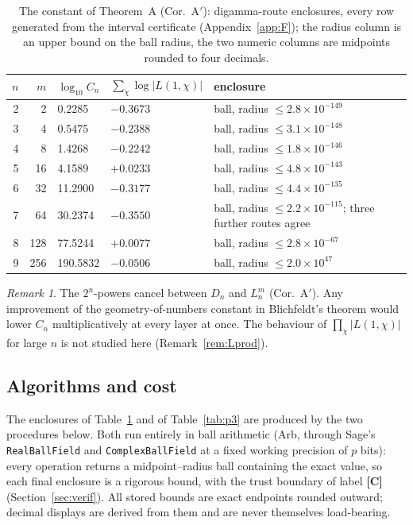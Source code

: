 \documentclass[11pt]{amsart}
\theoremstyle{remark}\newtheorem{remark}[theorem]{Remark}
\theoremstyle{definition}\newtheorem{definition}[theorem]{Definition}
\theoremstyle{definition}\newtheorem{algorithm}[theorem]{Algorithm}
\newcommand{\lbl}[1]{\textbf{[#1]}}\newcommand{\barT}{\bar T_n}
\begin{document}
\begin{table}[h]\footnotesize
\begin{tabular}{@{}rrllp{5.6cm}@{}}\toprule
$n$ & $m$ & $\log_{10}C_n$ & $\sum_\chi\log|L(1,\chi)|$ & enclosure\\ \midrule
2 & 2 & 0.2285 & $-0.3673$ & ball, radius $\le2.8\times10^{-149}$\\
3 & 4 & 0.5475 & $-0.2388$ & ball, radius $\le3.1\times10^{-148}$\\
4 & 8 & 1.4268 & $-0.2242$ & ball, radius $\le1.8\times10^{-146}$\\
5 & 16 & 4.1589 & $+0.0233$ & ball, radius $\le4.8\times10^{-143}$\\
6 & 32 & 11.2900 & $-0.3177$ & ball, radius $\le4.4\times10^{-135}$\\
7 & 64 & 30.2374 & $-0.3550$ & ball, radius $\le2.2\times10^{-115}$; three further routes agree\\
8 & 128 & 77.5244 & $+0.0077$ & ball, radius $\le2.8\times10^{-67}$\\
9 & 256 & 190.5832 & $-0.0506$ & ball, radius $\le2.0\times10^{47}$\\
\bottomrule\end{tabular}
\caption{The constant of Theorem~A (Cor.~A$'$): digamma-route enclosures, every row generated from the interval certificate (Appendix~\ref{app:F}); the radius column is an upper bound on the ball radius, the two numeric columns are midpoints rounded to four decimals.}\label{tab:Cn}
\end{table}
\begin{remark}
The $2^n$-powers cancel between $D_n$ and $L_n^m$ (Cor.~A$'$). Any improvement of the geometry-of-numbers constant in Blichfeldt's theorem would lower $C_n$ multiplicatively at every layer at once. The behaviour of $\prod_\chi|L(1,\chi)|$ for large $n$ is not studied here (Remark~\ref{rem:Lprod}).
\end{remark}

\subsection{Algorithms and cost}\label{sec:algo}
The enclosures of Table~\ref{tab:Cn} and of Table~\ref{tab:p3} are produced by the two procedures below. Both run entirely in ball arithmetic (Arb, through Sage's \texttt{RealBallField} and \texttt{ComplexBallField} at a fixed working precision of $p$ bits): every operation returns a midpoint--radius ball containing the exact value, so each final enclosure is a rigorous bound, with the trust boundary of label \lbl{C} (Section~\ref{sec:verif}). All stored bounds are exact endpoints rounded outward; decimal displays are derived from them and are never themselves load-bearing.
\end{document}
